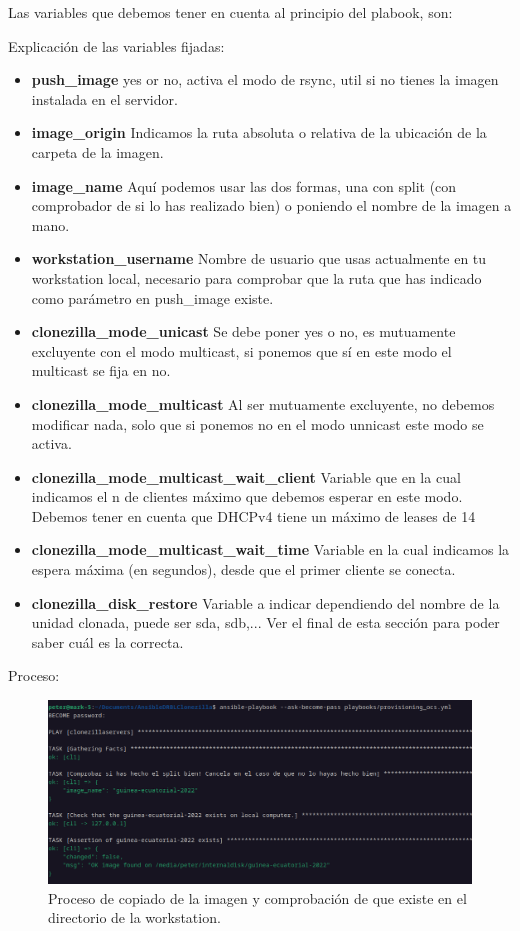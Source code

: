 Las variables que debemos tener en cuenta al principio del plabook, son:



Explicación de las variables fijadas:

\begin{itemize}
	\item \textbf{push\_image} yes or no, activa el modo de rsync, util si no tienes la imagen instalada en el servidor. 
	\item \textbf{image\_origin} Indicamos la ruta absoluta o relativa de la ubicación de la carpeta de la imagen.
	\item \textbf{image\_name} Aquí podemos usar las dos formas, una con split (con comprobador de si lo has realizado bien) o poniendo el nombre de la imagen a mano.
	\item \textbf{workstation\_username} Nombre de usuario que usas actualmente en tu workstation local, necesario para comprobar que la ruta que has indicado como parámetro en push\_image existe.
	\item \textbf{clonezilla\_mode\_unicast} Se debe poner yes o no, es mutuamente excluyente con el modo multicast, si ponemos que sí en este modo el multicast se fija en no.
	\item \textbf{clonezilla\_mode\_multicast} Al ser mutuamente excluyente, no debemos modificar nada, solo que si ponemos no en el modo unnicast este modo se activa.
	\item \textbf{clonezilla\_mode\_multicast\_wait\_client} Variable que en la cual indicamos el n de clientes máximo que debemos esperar en este modo. Debemos tener en cuenta que DHCPv4 tiene un máximo de leases de 14
	\item \textbf{clonezilla\_mode\_multicast\_wait\_time} Variable en la cual indicamos la espera máxima (en segundos), desde que el primer cliente se conecta.
	\item \textbf{clonezilla\_disk\_restore} Variable a indicar dependiendo del nombre de la unidad clonada, puede ser sda, sdb,... Ver el final de esta sección para poder saber cuál es la correcta.
\end{itemize}

Proceso:

\begin{figure}[H]
	\centering
	\includegraphics[scale=0.30]{provisioning-ocs/provisioning02}
	\caption{Proceso de copiado de la imagen y comprobación de que existe en el directorio de la workstation.}
\end{figure}

